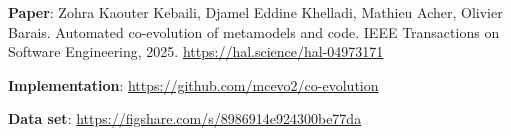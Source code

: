 \begin{myexamplec}
	\small
	\textbf{Paper}: 
	Zohra Kaouter Kebaili, Djamel Eddine Khelladi, Mathieu Acher, Olivier Barais. Automated co-evolution of metamodels and code. IEEE Transactions on Software Engineering, 2025. %
    \url{https://hal.science/hal-04973171}
	
	\textbf{Implementation}: 
	\url{https://github.com/mcevo2/co-evolution}
	
	\textbf{Data set}: \url{https://figshare.com/s/8986914e924300be77da}
\end{myexamplec}
%

%
%

